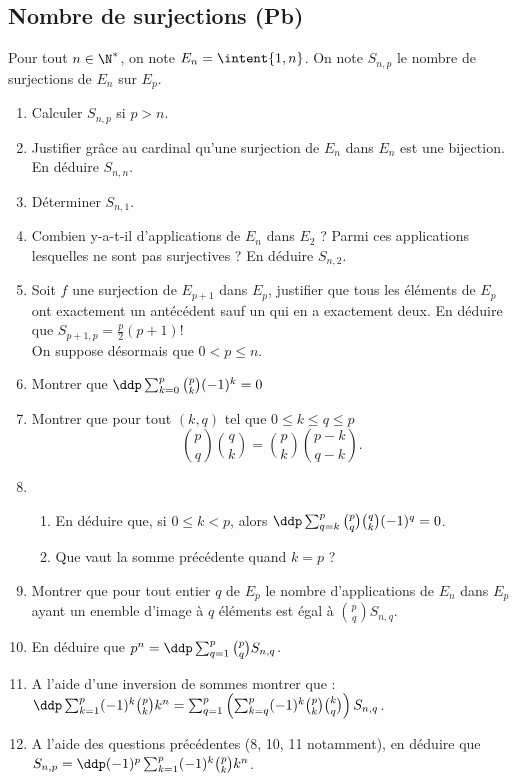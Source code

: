 \subsection{Nombre de surjections (Pb)}

\begin{exercice}
Pour tout $n\in \N^*$, on note $E_n=\intent{1,n}$. 
On note $S_{n,p}$ le nombre de surjections de $E_n$ sur $E_p$. 
\begin{enumerate}
\item Calculer $S_{n,p}$ si $p>n$. 
\item Justifier grâce au cardinal qu'une surjection de $E_n$ dans $E_n$ est une bijection. En déduire $S_{n,n}$.
\item Déterminer $S_{n,1}$. 
\item Combien y-a-t-il d'applications de $E_n$ dans $E_2$ ? Parmi ces applications lesquelles ne sont pas surjectives ? En déduire $S_{n,2}$. 
\item Soit $f$ une surjection de $E_{p+1}$ dans $E_p$, justifier que tous les éléments de $E_p$ ont exactement un antécédent sauf un qui en a exactement deux. 
En déduire que $S_{p+1,p} = \frac{p}{2}(p+1)!$\\

On suppose désormais que $0< p \leq n$. 
\item Montrer que $\ddp \sum_{k=0}^p \binom{p}{k}(-1)^k=0$
\item Montrer que pour tout $(k,q)$ tel que $0\leq k \leq q \leq p $ 
$$\binom{p}{q}\binom{q}{k}=\binom{p}{k}\binom{p-k}{q-k}.$$
\item \begin{enumerate}
\item En déduire que, si 
$0\leq k <p$, alors $\ddp \sum_{q=k}^p \binom{p}{q}\binom{q}{k} (-1)^q =0$.
\item  Que vaut la somme précédente quand $k=p$ ?
\end{enumerate}

\item Montrer que pour tout entier $q$ de $E_p$ le nombre d'applications de $E_n$ dans $E_p$ ayant un enemble d'image à $q$ éléments est égal à $\binom{p}{q} S_{n,q}$. 
\item En déduire que $p^n =\ddp \sum_{q=1}^p\binom{p}{q} S_{n,q}$. 
\item A l'aide d'une inversion de sommes montrer que : $\ddp \sum_{k=1}^p (-1)^k \binom{p}{k}k^n=\sum_{q=1}^p \left(\sum_{k=q}^p (-1)^k \binom{p}{k}\binom{k}{q} \right) S_{n,q}  $.
\item A l'aide des questions précédentes (8, 10, 11 notamment), en déduire que $S_{n,p} = \ddp (-1)^p \sum_{k=1}^p (-1)^k \binom{p}{k}k^n$.\\


\end{enumerate}
\end{exercice}
